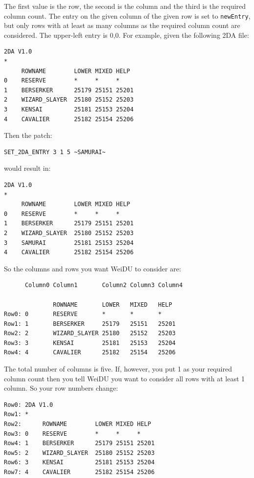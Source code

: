 \documentclass{article}
\def\t#1{{\tt #1}}
\begin{document}
The first value is the row, the second is the column and the third is the
required column count. The entry on the given column of the given row is
set to \t{newEntry}, but only rows with at least as many columns as the
required column count are considered. The upper-left entry is 0,0. For
example, given the following 2DA file:

\begin{verbatim}
2DA V1.0
*
     ROWNAME        LOWER MIXED HELP
0    RESERVE        *     *     *
1    BERSERKER      25179 25151 25201
2    WIZARD_SLAYER  25180 25152 25203
3    KENSAI         25181 25153 25204
4    CAVALIER       25182 25154 25206
\end{verbatim}

Then the patch:

\begin{verbatim}
SET_2DA_ENTRY 3 1 5 ~SAMURAI~
\end{verbatim}

would result in:

\begin{verbatim}
2DA V1.0
*
     ROWNAME        LOWER MIXED HELP
0    RESERVE        *     *     *
1    BERSERKER      25179 25151 25201
2    WIZARD_SLAYER  25180 25152 25203
3    SAMURAI        25181 25153 25204
4    CAVALIER       25182 25154 25206
\end{verbatim}

So the columns and rows you want WeiDU to consider are:

\begin{verbatim}
      Column0 Column1       Column2 Column3 Column4

              ROWNAME       LOWER   MIXED   HELP
Row0: 0       RESERVE       *       *       *
Row1: 1       BERSERKER     25179   25151   25201
Row2: 2       WIZARD_SLAYER 25180   25152   25203
Row3: 3       KENSAI        25181   25153   25204
Row4: 4       CAVALIER      25182   25154   25206
\end{verbatim}

The total number of columns is five. If, however, you put 1 as your
required column count then you tell WeiDU you want to consider all rows
with at least 1 column. So your row numbers change:

\begin{verbatim}
Row0: 2DA V1.0
Row1: *
Row2:      ROWNAME        LOWER MIXED HELP
Row3: 0    RESERVE        *     *     *
Row4: 1    BERSERKER      25179 25151 25201
Row5: 2    WIZARD_SLAYER  25180 25152 25203
Row6: 3    KENSAI         25181 25153 25204
Row7: 4    CAVALIER       25182 25154 25206
\end{verbatim}
\end{document}
